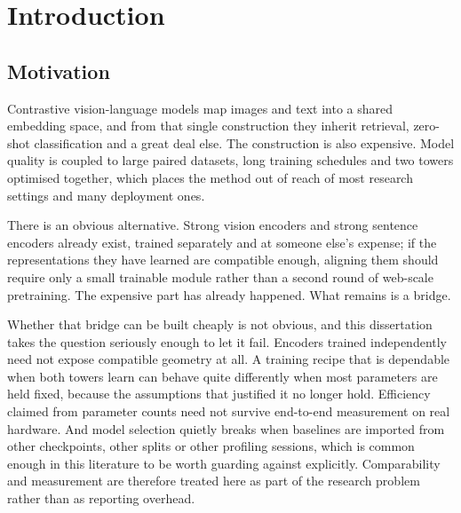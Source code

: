 \chapter{Introduction}
\section{Motivation}
Contrastive vision-language models map images and text into a shared embedding space, and from that single construction they inherit retrieval, zero-shot classification and a great deal else. The construction is also expensive. Model quality is coupled to large paired datasets, long training schedules and two towers optimised together, which places the method out of reach of most research settings and many deployment ones.

There is an obvious alternative. Strong vision encoders and strong sentence encoders already exist, trained separately and at someone else's expense; if the representations they have learned are compatible enough, aligning them should require only a small trainable module rather than a second round of web-scale pretraining. The expensive part has already happened. What remains is a bridge.

Whether that bridge can be built cheaply is not obvious, and this dissertation takes the question seriously enough to let it fail. Encoders trained independently need not expose compatible geometry at all. A training recipe that is dependable when both towers learn can behave quite differently when most parameters are held fixed, because the assumptions that justified it no longer hold. Efficiency claimed from parameter counts need not survive end-to-end measurement on real hardware. And model selection quietly breaks when baselines are imported from other checkpoints, other splits or other profiling sessions, which is common enough in this literature to be worth guarding against explicitly. Comparability and measurement are therefore treated here as part of the research problem rather than as reporting overhead.

